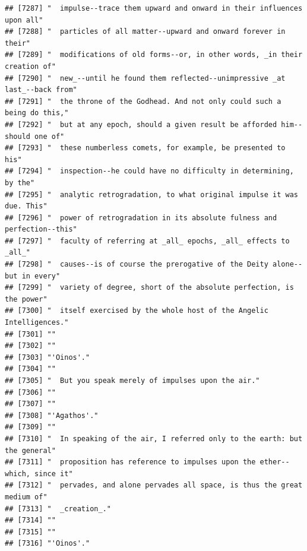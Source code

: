 \documentclass{article}\usepackage[]{graphicx}\usepackage[]{color}
\makeatletter
\newenvironment{kframe}{%
 \def\at@end@of@kframe{}%
 \ifinner\ifhmode%
  \def\at@end@of@kframe{\end{minipage}}%
  \begin{minipage}{\columnwidth}%
 \fi\fi%
 \def\FrameCommand##1{\hskip\@totalleftmargin \hskip-\fboxsep
 \colorbox{shadecolor}{##1}\hskip-\fboxsep
     \hskip-\linewidth \hskip-\@totalleftmargin \hskip\columnwidth}%
 \MakeFramed {\advance\hsize-\width
   \@totalleftmargin\z@ \linewidth\hsize
   \@setminipage}}%
 {\par\unskip\endMakeFramed%
 \at@end@of@kframe}
\newenvironment{knitrout}{}{} %
\makeatother
\begin{document}
\begin{knitrout}
\begin{kframe}
\begin{verbatim}
## [7287] "  impulse--trace them upward and onward in their influences upon all"        
## [7288] "  particles of all matter--upward and onward forever in their"               
## [7289] "  modifications of old forms--or, in other words, _in their creation of"     
## [7290] "  new_--until he found them reflected--unimpressive _at last_--back from"    
## [7291] "  the throne of the Godhead. And not only could such a being do this,"       
## [7292] "  but at any epoch, should a given result be afforded him--should one of"    
## [7293] "  these numberless comets, for example, be presented to his"                 
## [7294] "  inspection--he could have no difficulty in determining, by the"            
## [7295] "  analytic retrogradation, to what original impulse it was due. This"        
## [7296] "  power of retrogradation in its absolute fulness and perfection--this"      
## [7297] "  faculty of referring at _all_ epochs, _all_ effects to _all_"              
## [7298] "  causes--is of course the prerogative of the Deity alone--but in every"     
## [7299] "  variety of degree, short of the absolute perfection, is the power"         
## [7300] "  itself exercised by the whole host of the Angelic Intelligences."          
## [7301] ""                                                                            
## [7302] ""                                                                            
## [7303] "'Oinos'."                                                                    
## [7304] ""                                                                            
## [7305] "  But you speak merely of impulses upon the air."                            
## [7306] ""                                                                            
## [7307] ""                                                                            
## [7308] "'Agathos'."                                                                  
## [7309] ""                                                                            
## [7310] "  In speaking of the air, I referred only to the earth: but the general"     
## [7311] "  proposition has reference to impulses upon the ether--which, since it"     
## [7312] "  pervades, and alone pervades all space, is thus the great medium of"       
## [7313] "  _creation_."                                                               
## [7314] ""                                                                            
## [7315] ""                                                                            
## [7316] "'Oinos'."                                                                    

\end{verbatim}
\end{kframe}
\end{knitrout}
\end{document}
